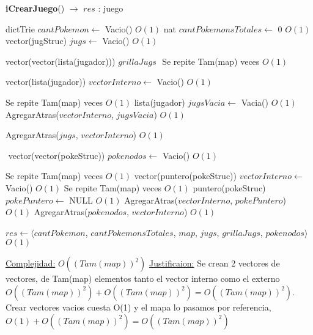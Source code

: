 \begin{Algoritmos}


\begin{algorithm}[H]
{\textbf{iCrearJuego}() $\to$ $res$ : juego}
\begin{algorithmic}[1]

\State dictTrie $cantPokemon \gets $ Vacio()  \Comment $O(1)$
\State nat $cantPokemonsTotales \gets $ 0  \Comment $O(1)$
$ $\newline
\State vector(jugStruc)  $jugs \gets$ Vacio()     \Comment $O(1)$

\State vector(vector(lista(jugador)))   $grillaJugs$
$ $\newline
{} \Comment Se repite Tam(map) veces $O(1)$
	
	\State vector(lista(jugador)) $vectorInterno \gets$ Vacio()  \Comment $O(1)$
	
	  \Comment Se repite Tam(map) veces $O(1)$
		\State lista(jugador) $jugsVacia \gets$ Vacia()   \Comment $O(1)$
		\State AgregarAtras($vectorInterno$, $jugsVacia$) \Comment $O(1)$	 
	\EndFor
	
	AgregarAtras($jugs$, $vectorInterno$)   \Comment $O(1)$

\EndFor
$ $\newline
\State vector(vector(pokeStruc))  $pokenodos \gets$ Vacio()  \Comment $O(1)$

		\Comment Se repite Tam(map) veces $O(1)$
	\State vector(puntero(pokeStruc)) $vectorInterno \gets$ Vacio()  \Comment $O(1)$
	    \Comment Se repite Tam(map) veces $O(1)$
		\State puntero(pokeStruc) $pokePuntero \gets$ NULL   \Comment $O(1)$
		\State AgregarAtras($vectorInterno$, $pokePuntero$)	\Comment $O(1)$
	\EndFor
	AgregarAtras($pokenodos$, $vectorInterno$)   \Comment $O(1)$
\EndFor

\State $res \gets \langle cantPokemon$, $cantPokemonsTotales$, $map$, $jugs$, $grillaJugs$, $pokenodos \rangle$   \Comment $O(1)$

\medskip
\Statex \underline{Complejidad:} $O((Tam(map))^2)$
\Statex \underline{Justificaion:} Se crean 2 vectores de vectores, de Tam(map) elementos tanto el vector interno como el externo $O((Tam(map))^2) + O((Tam(map))^2) = O((Tam(map))^2)$. Crear vectores vacios cuesta O(1) y el mapa lo pasamos por referencia, $O(1) + O((Tam(map))^2) = O((Tam(map))^2)$


\end{algorithmic}
\end{algorithm}
\end{Algoritmos}
